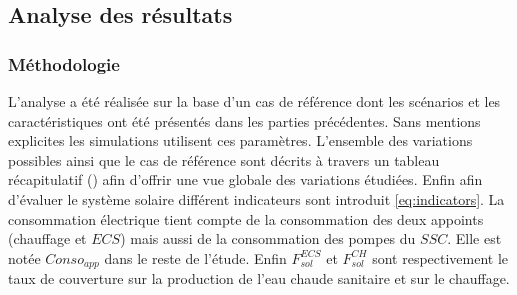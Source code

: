 \subsection{Analyse des résultats} %
\label{sub:analyse_des_resultats}
\subsubsection{Méthodologie} %
\label{ssub:methodologie}
L’analyse a été réalisée sur la base d’un cas de référence dont les scénarios et les
caractéristiques ont été présentés dans les parties précédentes. Sans mentions explicites les
simulations utilisent ces paramètres. L’ensemble des variations possibles ainsi que
le cas de référence sont décrits à travers un tableau récapitulatif ()
afin d’offrir une vue globale des variations étudiées.
Enfin afin d’évaluer le système solaire différent indicateurs sont introduit
\eqref{eq:indicators}. La consommation électrique tient compte de la consommation des deux
appoints (chauffage et $ECS$) mais aussi de la consommation des pompes du $SSC$. Elle est
notée $Conso_{app}$ dans le reste de l’étude. Enfin $F_{sol}^{ECS}$ et $F_{sol}^{CH}$
sont respectivement le taux de couverture sur la production de l’eau chaude sanitaire
et sur le chauffage.


